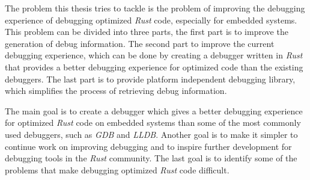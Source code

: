  

The problem this thesis tries to tackle is the problem of improving the debugging experience of debugging optimized \emph{Rust} code, especially for embedded systems.
This problem can be divided into three parts, the first part is to improve the generation of debug information.
The second part to improve the current debugging experience, which can be done by creating a debugger written in \emph{Rust} that provides a better debugging experience for optimized code than the existing debuggers.
The last part is to provide platform independent debugging library, which simplifies the process of retrieving debug information.


The main goal is to create a debugger which gives a better debugging experience for optimized \emph{Rust} code on embedded systems than some of the most commonly used debuggers, such as \emph{GDB} and \emph{LLDB}.
Another goal is to make it simpler to continue work on improving debugging and to inspire further development for debugging tools in the \emph{Rust} community.
The last goal is to identify some of the problems that make debugging optimized \emph{Rust} code difficult.


